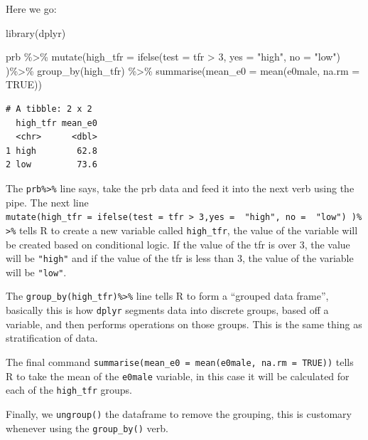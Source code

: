 \documentclass[
  letterpaper,
  DIV=11,
  numbers=noendperiod]{scrreprt}
\newenvironment{Shaded}{\begin{snugshade}}{\end{snugshade}}
\newcommand{\AttributeTok}[1]{\textcolor[rgb]{0.40,0.45,0.13}{#1}}
\newcommand{\ConstantTok}[1]{\textcolor[rgb]{0.56,0.35,0.01}{#1}}
\newcommand{\DecValTok}[1]{\textcolor[rgb]{0.68,0.00,0.00}{#1}}
\newcommand{\FunctionTok}[1]{\textcolor[rgb]{0.28,0.35,0.67}{#1}}
\newcommand{\NormalTok}[1]{\textcolor[rgb]{0.00,0.23,0.31}{#1}}
\newcommand{\SpecialCharTok}[1]{\textcolor[rgb]{0.37,0.37,0.37}{#1}}
\newcommand{\StringTok}[1]{\textcolor[rgb]{0.13,0.47,0.30}{#1}}
\begin{document}
Here we go:

\begin{Shaded}
\begin{Highlighting}[]
\FunctionTok{library}\NormalTok{(dplyr)}

\NormalTok{prb }\SpecialCharTok{\%\textgreater{}\%}
  \FunctionTok{mutate}\NormalTok{(}\AttributeTok{high\_tfr =} \FunctionTok{ifelse}\NormalTok{(}\AttributeTok{test =}\NormalTok{ tfr }\SpecialCharTok{\textgreater{}} \DecValTok{3}\NormalTok{,}
                           \AttributeTok{yes =}  \StringTok{"high"}\NormalTok{,}
                           \AttributeTok{no =}  \StringTok{"low"}\NormalTok{) )}\SpecialCharTok{\%\textgreater{}\%}
  \FunctionTok{group\_by}\NormalTok{(high\_tfr) }\SpecialCharTok{\%\textgreater{}\%}
  \FunctionTok{summarise}\NormalTok{(}\AttributeTok{mean\_e0 =} \FunctionTok{mean}\NormalTok{(e0male, }\AttributeTok{na.rm =} \ConstantTok{TRUE}\NormalTok{))}
\end{Highlighting}
\end{Shaded}

\begin{verbatim}
# A tibble: 2 x 2
  high_tfr mean_e0
  <chr>      <dbl>
1 high        62.8
2 low         73.6
\end{verbatim}

The \texttt{prb\%\textgreater{}\%} line says, take the prb data and feed
it into the next verb using the pipe. The next line
\texttt{mutate(high\_tfr\ =\ ifelse(test\ =\ tfr\ \textgreater{}\ 3,yes\ =\ \ "high",\ no\ =\ \ "low")\ )\%\textgreater{}\%}
tells R to create a new variable called \texttt{high\_tfr}, the value of
the variable will be created based on conditional logic. If the value of
the tfr is over 3, the value will be \texttt{"high"} and if the value of
the tfr is less than 3, the value of the variable will be
\texttt{"low"}.

The \texttt{group\_by(high\_tfr)\%\textgreater{}\%} line tells R to form
a ``grouped data frame'', basically this is how \texttt{dplyr} segments
data into discrete groups, based off a variable, and then performs
operations on those groups. This is the same thing as stratification of
data.

The final command
\texttt{summarise(mean\_e0\ =\ mean(e0male,\ na.rm\ =\ TRUE))} tells R
to take the mean of the \texttt{e0male} variable, in this case it will
be calculated for each of the \texttt{high\_tfr} groups.

Finally, we \texttt{ungroup()} the dataframe to remove the grouping,
this is customary whenever using the \texttt{group\_by()} verb.
\end{document}
